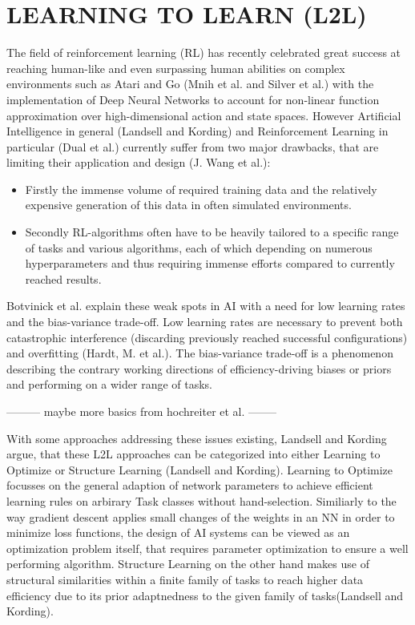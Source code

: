 \documentclass[letterpaper, 10 pt, conference]{ieeeconf}  %
\begin{document}
\section{LEARNING TO LEARN (L2L)}

The field of reinforcement learning (RL) has recently celebrated great success at reaching human-like and even surpassing human abilities on
complex environments such as Atari and Go (Mnih et al. and Silver et al.) with the implementation of Deep Neural Networks to 
account for non-linear function approximation over high-dimensional action and state spaces. However Artificial Intelligence in general 
(Landsell and Kording) and Reinforcement Learning in particular (Dual et al.) currently suffer from two major drawbacks, 
that are limiting their application and design (J. Wang et al.): 
\begin{itemize}
        \item Firstly the immense volume of required training data and the relatively expensive generation of this data in often simulated
        environments.
        \item Secondly RL-algorithms often have to be heavily tailored to a specific range of tasks and various algorithms, each of which
        depending on numerous hyperparameters and thus requiring immense efforts compared to currently reached results.
\end{itemize}        

Botvinick et al. explain these weak spots in AI with a need for low learning rates and the bias-variance trade-off.
Low learning rates are necessary to prevent both catastrophic interference (discarding previously reached successful
configurations) and overfitting (Hardt, M. et al.). The bias-variance trade-off is a phenomenon describing the contrary 
working directions of efficiency-driving biases or priors and performing on a wider range of tasks. \newline

--------- maybe more basics from hochreiter et al. -------- \newline

With some approaches addressing these issues existing, Landsell and Kording argue, that these L2L approaches can be categorized into 
either Learning to Optimize or Structure Learning (Landsell and Kording). Learning to Optimize focusses on the general 
adaption of network parameters to achieve efficient learning rules on arbirary Task classes without hand-selection. Similiarly to the way
gradient descent applies small changes of the weights in an NN in order to minimize loss functions, the design of AI systems can be viewed as
an optimization problem itself, that requires parameter optimization to ensure a well performing algorithm. Structure Learning 
on the other hand makes use of structural similarities within a finite family of tasks to reach higher data
efficiency due to its prior adaptnedness to the given family of tasks(Landsell and Kording). \newline
\end{document}

